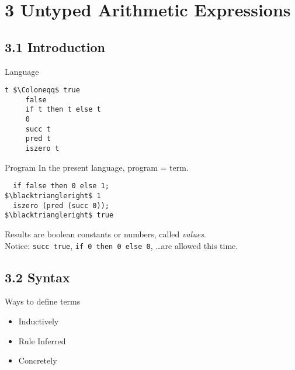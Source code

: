 
\section*{3 Untyped Arithmetic Expressions}

\subsection*{3.1 Introduction}

\begin{frame}[fragile]{Language}
\begin{lstlisting}
t $\Coloneqq$ true
     false
     if t then t else t
     0
     succ t
     pred t
     iszero t
\end{lstlisting}
\end{frame}

\begin{frame}[fragile]{Program}
In the present language, program = term.
\begin{lstlisting}
  if false then 0 else 1;
$\blacktriangleright$ 1
  iszero (pred (succ 0));
$\blacktriangleright$ true
\end{lstlisting}
Results are boolean constants or numbers, called \textit{values}.\\
Notice: \texttt{succ true}, \texttt{if 0 then 0 else 0}, \dots are allowed this time.
\end{frame}

\subsection*{3.2 Syntax}

\begin{frame}{Ways to define terms}
\begin{itemize}
  \item Inductively
  \item Rule Inferred
  \item Concretely
\end{itemize}
\end{frame}

